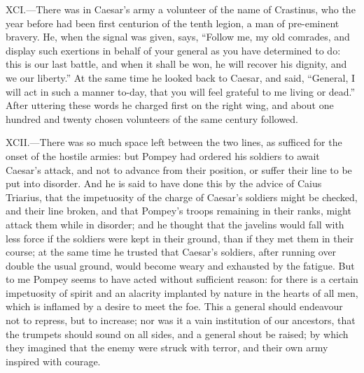 XCI.—There was in Caesar's army a volunteer of the name of Crastinus,
who the year before had been first centurion of the tenth legion, a man
of pre-eminent bravery. He, when the signal was given, says, ``Follow me,
my old comrades, and display such exertions in behalf of your general as
you have determined to do: this is our last battle, and when it shall be
won, he will recover his dignity, and we our liberty.'' At the same time
he looked back to Caesar, and said, ``General, I will act in such a
manner to-day, that you will feel grateful to me living or dead.'' After
uttering these words he charged first on the right wing, and about one
hundred and twenty chosen volunteers of the same century followed.

XCII.—There was so much space left between the two lines, as sufficed
for the onset of the hostile armies: but Pompey had ordered his soldiers
to await Caesar's attack, and not to advance from their position, or
suffer their line to be put into disorder. And he is said to have done
this by the advice of Caius Triarius, that the impetuosity of the charge
of Caesar's soldiers might be checked, and their line broken, and that
Pompey's troops remaining in their ranks, might attack them while in
disorder; and he thought that the javelins would fall with less force if
the soldiers were kept in their ground, than if they met them in their
course; at the same time he trusted that Caesar's soldiers, after
running over double the usual ground, would become weary and exhausted
by the fatigue. But to me Pompey seems to have acted without sufficient
reason: for there is a certain impetuosity of spirit and an alacrity
implanted by nature in the hearts of all men, which is inflamed by a
desire to meet the foe. This a general should endeavour not to repress,
but to increase; nor was it a vain institution of our ancestors, that
the trumpets should sound on all sides, and a general shout be raised;
by which they imagined that the enemy were struck with terror, and their
own army inspired with courage.

